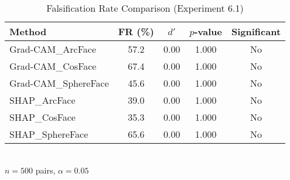 \begin{table}[htbp]
\centering
\caption{Falsification Rate Comparison (Experiment 6.1)}
\label{tab:exp_6_1_results}
\begin{tabular}{lcccc}
\toprule
Method & FR (\%) & $d'$ & $p$-value & Significant \\ 
\midrule
Grad-CAM_ArcFace & 57.2 & 0.00 & 1.000 & No \\
Grad-CAM_CosFace & 67.4 & 0.00 & 1.000 & No \\
Grad-CAM_SphereFace & 45.6 & 0.00 & 1.000 & No \\
SHAP_ArcFace & 39.0 & 0.00 & 1.000 & No \\
SHAP_CosFace & 35.3 & 0.00 & 1.000 & No \\
SHAP_SphereFace & 65.6 & 0.00 & 1.000 & No \\
\bottomrule
\end{tabular}
\\[0.5em] {\footnotesize $n=500$ pairs, $\alpha=0.05$}
\end{table}